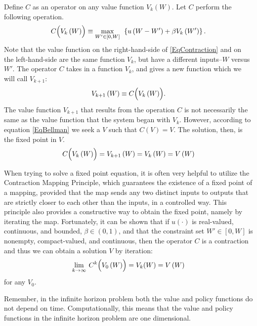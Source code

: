 Define $C$ as an operator on any value function $V_k\left(W\right)$. Let $C$ perform the following operation.
\begin{equation}
\label{EqContraction}
C\Bigl(V_k\left(W\right)\Bigr) \equiv \max_{W'\in[0,W]}\:\: \left\{u\left(W-W'\right) + \beta V_k\left(W'\right)\right\}.
\end{equation}
Note that the value function on the right-hand-side of \eqref{EqContraction} and on the left-hand-side are the same function $V_k$,
but have a different inputs--$W$ versus $W'$. The operator $C$ takes in a function $V_k$, and gives a new
function which we will call $V_{k+1}$:
\begin{equation*}
V_{k+1}\left(W\right) \equiv C\Bigl(V_k\left(W\right)\Bigr).
\end{equation*}
The value function $V_{k+1}$ that results from the operation $C$ is not necessarily the same as the value function that the system
began with $V_k$. However, according to equation \eqref{EqBellman} we seek a $V$ such that $C(V) = V$.  The solution, then, is the
fixed point in $V$.
\begin{equation*}
C\Bigl(V_k\left(W\right)\Bigr) = V_{k+1}\left(W\right) = V_k\left(W\right) = V\left(W\right)
\end{equation*}

When trying to solve a fixed point equation, it is often very helpful to utilize the Contraction Mapping Principle, which
guarantees the existence of a fixed point of a mapping, provided that the map sends any two distinct inputs to outputs
that are strictly closer to each other than the inputs, in a controlled way. This principle also provides a constructive
way to obtain the fixed point, namely by iterating the map.
Fortunately, it can be shown that if $u(\cdot)$ is real-valued, continuous, and bounded, $\beta\in(0,1)$, and that the constraint
set $W'\in[0,W]$ is nonempty, compact-valued, and continuous, then the operator $C$ is a contraction and thus we can obtain
a solution $V$ by iteration:
\begin{equation*}
\lim_{k\rightarrow\infty}\: C^k\Bigl(V_0\left(W\right)\Bigr) = V_k(W) =  V\left(W\right)
\end{equation*}
for any $V_0$.

Remember, in the infinite horizon problem both the value and policy functions do not depend on time.  Computationally, this means that
 the value and policy functions in the infinite horizon problem are one dimensional.

